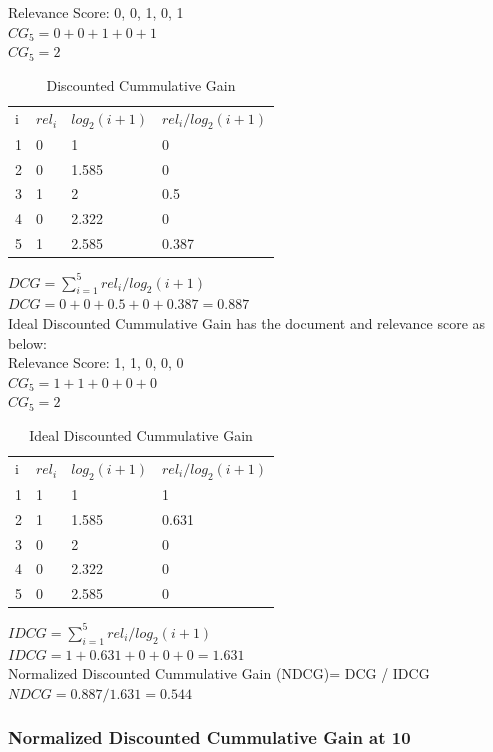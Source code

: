 \documentclass[12pt]{report}
\begin{document}
Relevance Score: 0, 0, 1, 0, 1\\
$CG_5 = 0+ 0+ 1+ 0+ 1$\\
$CG_5 = 2$ \\
\begin{table}[]
\centering
\caption{Discounted Cummulative Gain}
\label{my-label}
\begin{tabular}{llll}
i & $rel_i$ & $log_2(i + 1)$   & $rel_i / log_2(i + 1)$  \\
1 & 0        & 1     		    & 0   \\
2 & 0        & 1.585 		    & 0 \\
3 & 1        & 2     		    & 0.5  \\
4 & 0        & 2.322 		    & 0 \\
5 & 1        & 2.585 		    & 0.387   
\end{tabular}
\end{table}
$DCG = \sum\limits_{i=1}^5 rel_i / log_2(i + 1)$ \\
$DCG = 0 + 0 + 0.5 + 0 + 0.387 =  0.887$\\

Ideal Discounted Cummulative Gain has the document and relevance score as below:\\
Relevance Score: 1, 1, 0, 0, 0\\
$CG_5 = 1+ 1+ 0+ 0+ 0$\\
$CG_5 = 2$ \\
\begin{table}[]
\centering
\caption{Ideal Discounted Cummulative Gain}
\label{my-label}
\begin{tabular}{llll}
i & $rel_i$ & $log_2(i + 1)$   & $rel_i / log_2(i + 1)$  \\
1 & 1        & 1     		    & 1    \\
2 & 1        & 1.585 		    & 0.631 \\
3 & 0        & 2     		    & 0  \\
4 & 0        & 2.322 		    & 0 \\
5 & 0        & 2.585 		    & 0   
\end{tabular}
\end{table}
$IDCG = \sum\limits_{i=1}^5 rel_i / log_2(i + 1)$ \\
$IDCG = 1 + 0.631 + 0 + 0 + 0 =  1.631$\\
Normalized Discounted Cummulative Gain (NDCG)=  DCG / IDCG\\
$NDCG = 0.887 / 1.631 = 0.544$

\subsubsection{Normalized Discounted Cummulative Gain at 10}
\end{document}
